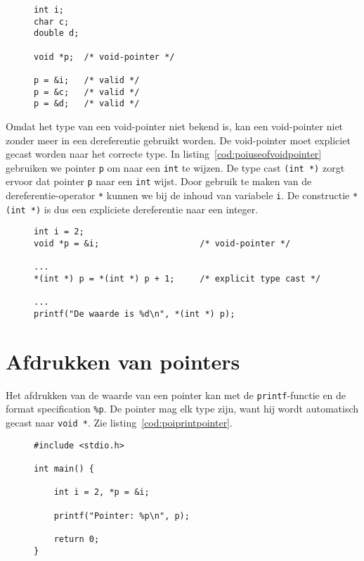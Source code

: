 \begin{figure}[!ht]
\begin{lstlisting}[caption=Definitie en initialisatie van een \texttt{void}-pointer.]
int i;
char c;
double d;

void *p;  /* void-pointer */

p = &i;   /* valid */
p = &c;   /* valid */
p = &d;   /* valid */
\end{lstlisting}
\end{figure}

Omdat het type van een void-pointer niet bekend is, kan een void-pointer niet zonder meer in een dereferentie gebruikt worden. De void-pointer moet expliciet gecast worden naar het correcte type. In listing~\ref{cod:poiuseofvoidpointer} gebruiken we pointer \texttt{p} om naar een \texttt{int} te wijzen. De type cast \texttt{(int *)} zorgt ervoor dat pointer \texttt{p} naar een \texttt{int} wijst. Door gebruik te maken van de dereferentie-operator \texttt{*} kunnen we bij de inhoud van variabele \texttt{i}. De constructie \texttt{*(int *)} is dus een expliciete dereferentie naar een integer.

\begin{figure}[!ht]
\begin{lstlisting}[caption={Definitie, initialisatie en deference van een \texttt{void}-pointer.},label=cod:poiuseofvoidpointer]
int i = 2;
void *p = &i;                    /* void-pointer */

...
*(int *) p = *(int *) p + 1;     /* explicit type cast */

...
printf("De waarde is %d\n", *(int *) p);
\end{lstlisting}
\end{figure}


\section{Afdrukken van pointers}
\label{sec:afdrukkenvanpointers}
Het afdrukken van de waarde van een pointer kan met de \texttt{printf}-functie en de format specification \texttt{\%p}. De pointer mag elk type zijn, want hij wordt automatisch gecast naar \texttt{void *}. Zie listing~\ref{cod:poiprintpointer}.

\begin{figure}[!ht]
\begin{lstlisting}[caption=Afdrukken van een pointer.,label=cod:poiprintpointer]
#include <stdio.h>

int main() {

    int i = 2, *p = &i;

    printf("Pointer: %p\n", p);

    return 0;
}
\end{lstlisting}
\end{figure}

